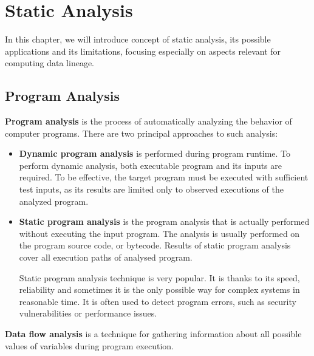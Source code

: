 
\chapter{Static Analysis \label{chapter:analysis}}


In this chapter, we will introduce concept of static analysis,
its possible applications and its limitations,
focusing especially on aspects relevant for computing data lineage.



\section{Program Analysis}

\textbf{Program analysis} is the process of automatically analyzing the behavior
of computer programs. There are two principal approaches to such analysis:
\begin{itemize}
  \item \textbf{Dynamic program analysis} is performed during program runtime.
    To perform dynamic analysis, both executable program
    and its inputs are required. To be effective, the target program
    must be executed with sufficient test inputs, as its results
    are limited only to observed executions of the analyzed program.
  \item \textbf{Static program analysis} is the program analysis that is actually
    performed without executing the input program. The analysis is usually
    performed on the program source code, or bytecode.
    Results of static program analysis cover all execution paths of
    analysed program.

    Static program analysis technique is very popular. It is thanks
    to its speed, reliability and sometimes it is the only possible
    way for complex systems in reasonable time.
    It is often used to detect program errors, such as
    security vulnerabilities or performance issues.
\end{itemize}

\textbf{Data flow analysis} is a technique for gathering information about
all possible values of variables during program execution.



